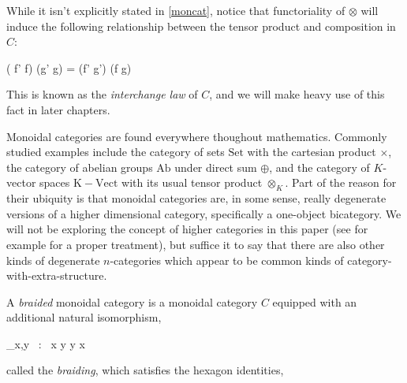 While it isn't explicitly stated in \cref{moncat}, notice that functoriality of $\otimes$ will induce the following relationship between the tensor product and composition in $C$:
\begin{eq*} ( f' \circ f) \otimes (g' \circ g) \quad = \quad (f' \otimes g') \circ (f \otimes g) \end{eq*}
This is known as the \emph{interchange law} of $C$, and we will make heavy use of this fact in later chapters.

Monoidal categories are found everywhere thoughout mathematics. Commonly studied examples include the category of sets $\mathrm{Set}$ with the cartesian product $\times$, the category of abelian groups $\mathrm{Ab}$ under direct sum $\oplus$, and the category of $K$-vector spaces $\mathrm{K-Vect}$ with its usual tensor product $\otimes_{K}$. Part of the reason for their ubiquity is that monoidal categories are, in some sense, really degenerate versions of a higher dimensional category, specifically a one-object bicategory. We will not be exploring the concept of higher categories in this paper (see for example \cite{hohc} for a proper treatment), but suffice it to say that there are also other kinds of degenerate $n$-categories which appear to be common kinds of category-with-extra-structure. 

\begin{defn} \label{bdmoncat} A \emph{braided} monoidal category is a monoidal category $C$ equipped with an additional natural isomorphism,
\begin{eq*} \beta_{x,y} \, : \, x \otimes y \longrightarrow y \otimes x \end{eq*}
called the \emph{braiding}, which satisfies the hexagon identities,
\begin{eq*}  \end{eq*}
\begin{eq*}  \end{eq*}
\end{defn}

